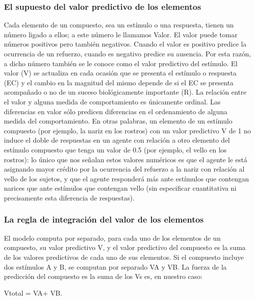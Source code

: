 \documentclass[
  letterpaper,
]{book}
\begin{document}
\subsubsection{El supuesto del valor predictivo de los
elementos}\label{el-supuesto-del-valor-predictivo-de-los-elementos}

Cada elemento de un compuesto, sea un estímulo o una respuesta, tienen
un número ligado a ellos; a este número le llamamos Valor. El valor
puede tomar números positivos pero también negativos. Cuando el valor es
positivo predice la ocurrencia de un refuerzo, cuando es negativo
predice su ausencia. Por esta razón, a dicho número también se le conoce
como el valor predictivo del estímulo. El valor (V) se actualiza en cada
ocasión que se presenta el estímulo o respuesta (EC) y el cambio en la
magnitud del mismo depende de si el EC se presenta acompañado o no de un
suceso biológicamente importante (R). La relación entre el valor y
alguna medida de comportamiento es únicamente ordinal. Las diferencias
en valor sólo predicen diferencias en el ordenamiento de alguna medida
del comportamiento. En otras palabras, un elemento de un estímulo
compuesto (por ejemplo, la nariz en los rostros) con un valor predictivo
V de 1 no induce el doble de respuestas en un agente con relación a otro
elemento del estímulo compuesto que tenga un valor de 0.5 (por ejemplo,
el vello en los rostros): lo único que nos señalan estos valores
numéricos es que el agente le está asignando mayor crédito por la
ocurrencia del refuerzo a la nariz con relación al vello de los sujetos,
y que el agente responderá más ante estímulos que contengan narices que
ante estímulos que contengan vello (sin especificar cuantitativa ni
precisamente esta diferencia de respuestas).

\subsubsection{La regla de integración del valor de los
elementos}\label{la-regla-de-integraciuxf3n-del-valor-de-los-elementos}

El modelo computa por separado, para cada uno de los elementos de un
compuesto, su valor predictivo V, y el valor predictivo del compuesto es
la suma de los valores predictivos de cada uno de sus elementos. Si el
compuesto incluye dos estímulos A y B, se computan por separado VA y VB.
La fuerza de la predicción del compuesto es la suma de los Vs es, en
nuestro caso:

Vtotal = VA+ VB.
\end{document}
